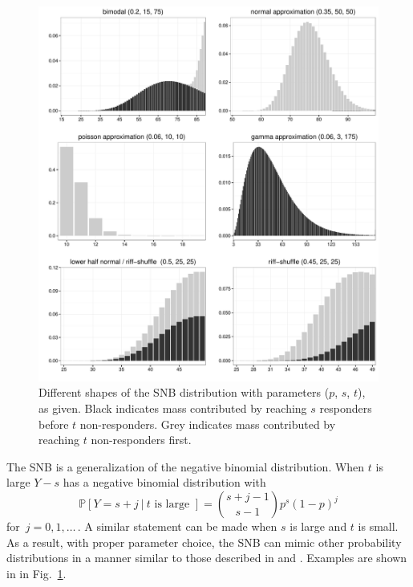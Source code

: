 \documentclass[review]{elsarticle}
\begin{document}
\begin{figure}[p!]
\begin{center}
\includegraphics[width=\textwidth]{shapes.pdf}
\end{center}
\caption{Different shapes of the SNB distribution with parameters 
($p$, $s$, $t$), as given. Black indicates mass contributed by reaching
$s$ responders before $t$ non-responders. Grey indicates
mass contributed by reaching $t$ non-responders first. \label{shapes.fig}}
\end{figure}

The SNB is a generalization of the negative 
binomial distribution. When $t$ is large $Y-s$ has a 
negative binomial distribution with
\begin{equation*}                                    %
\mathbb{P}[Y=s+j\ |\ t \text{ is large\ }]        \label{nb1.eq}          
  = {{s+j-1}\choose{s-1}} p^s (1-p)^j
\end{equation*}
for $\,j=0, 1,\ldots\,$. A similar statement can be made when $s$ is large
and $t$ is small. As a result, with proper parameter choice, the SNB
can mimic other probability distributions in a manner similar to 
those described in \cite{Peizer1968} and \cite{Best1974}. Examples are
shown in in Fig.~\ref{shapes.fig}. 
\end{document}
